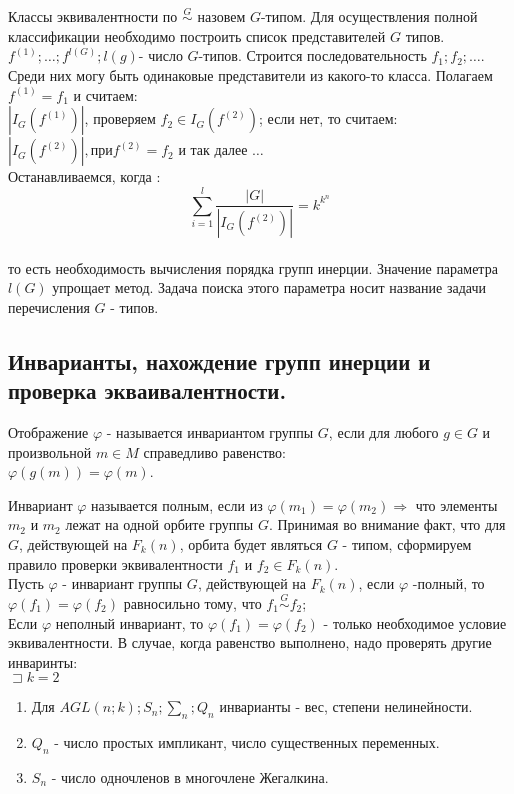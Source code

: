 Классы эквивалентности по $\stackrel{G}{\sim}$ назовем $G$-типом. Для осуществления полной классификации необходимо построить список представителей $G$ типов.
$f^{(1)};\dots; f^{l(G)}; l(g)$- число $G$-типов.
Строится последовательность $f_1;f_2;\dots $. Среди них могу быть одинаковые представители из какого-то класса. Полагаем $ f^{(1)}=f_1$ и считаем:\\ 
$|I_G(f^{(1)})|$, проверяем $f_2 \in I_G(f^{(2)})$; если нет, то считаем:\\
$|I_G(f^{(2)})|, при f^{(2)} =f_2$ и так далее $\dots$\\
Останавливаемся, когда :\\
$$
\sum_{i=1}^{l} \frac{|G|}{|I_G(f^{(2)})|} = k^{k^n}
$$\\ то есть необходимость вычисления порядка групп инерции. Значение параметра $l(G)$ упрощает метод. Задача поиска этого параметра носит название задачи перечисления $G$ - типов.\\

\subsection{Инварианты, нахождение групп инерции и проверка экваивалентности.}

\opr 
Отображение $\varphi$ - называется инвариантом группы $G$, если для любого $g \in G$ и произвольной $m \in M$ справедливо равенство:\\
$\varphi(g(m))=\varphi(m)$.

Инвариант $\varphi$ называется полным, если из $\varphi (m_1) = \varphi(m_2) \Rightarrow $ что элементы $m_2 $ и $m_2$ лежат на одной орбите группы $G$. Принимая во внимание факт, что для $G$, действующей на $F_k(n)$, орбита будет являться $G$ - типом, сформируем правило проверки эквивалентности $f_1 $ и $f_2 \in F_k(n)$.\\
Пусть $\varphi$ - инвариант группы $G$, действующей на $F_k(n)$, если $\varphi$ -полный, то $\varphi(f_1)=\varphi(f_2) $ равносильно тому, что $f_1 \stackrel{G}{\sim} f_2$;\\
Если $\varphi$ неполный инвариант, то $\varphi(f_1)=\varphi(f_2) $ - только необходимое условие эквивалентности.
В случае, когда равенство выполнено, надо проверять другие инваринты:\\

$\sqsupset k = 2$
\begin{enumerate}
	\item Для $AGL(n;k); S_n; \sum_n; Q_n $ инварианты - вес, степени нелинейности.
	\item $Q_n$ - число простых импликант, число существенных переменных.
	\item $S_n$ - число одночленов в многочлене Жегалкина.\\
\end{enumerate}

